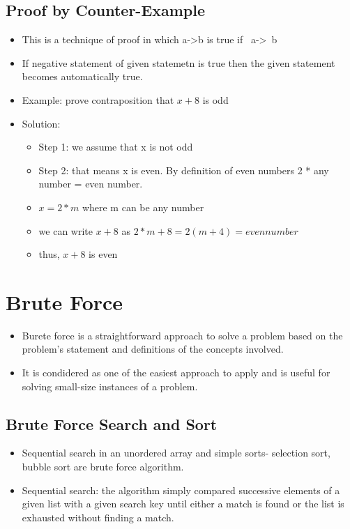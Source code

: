 \documentclass{article}
\begin{document}
\subsection{Proof by Counter-Example}
\begin{itemize}
	\item This is a technique of proof in which a->b is true if ~a->~b
	\item If negative statement of given statemetn is true then the given statement becomes automatically true.
	\item Example: prove contraposition that $ x + 8$ is odd
	\item Solution:
		\begin{itemize}
			\item Step 1: we assume that x is not odd
			\item Step 2: that means x is even. By definition of even numbers 2 * any number = even number.
			\item $ x = 2 * m$ 		where m can be any number
			\item we can write $ x+ 8$ as $ 2*m+8=2(m+4)= even number$
			\item thus, $ x + 8$ is even 
		\end{itemize}
\end{itemize}
\section{Brute Force}
\begin{itemize}
	\item Burete force is a straightforward approach to solve a problem based on the problem's statement and definitions of the concepts involved.
	\item It is condidered as one of the easiest approach to apply and is useful for solving small-size instances of a problem.
\end{itemize}
\subsection{Brute Force Search and Sort}
\begin{itemize}
	\item Sequential search in an unordered array and simple sorts- selection sort, bubble sort are brute force algorithm.
	\item Sequential search: the algorithm simply compared successive elements of a given list with a given search key until either a match is found or the list is exhausted without finding a match.
\end{itemize}
\end{document}
